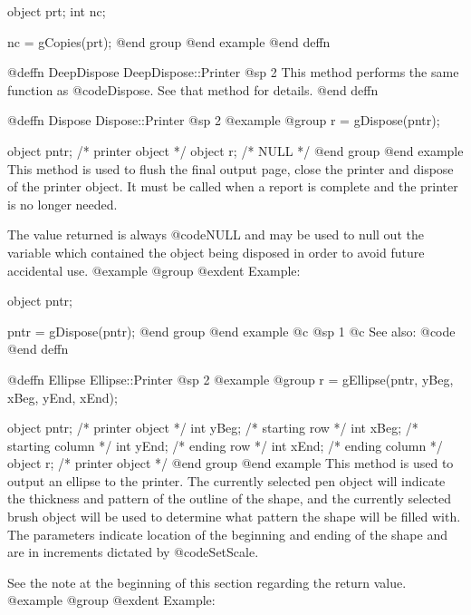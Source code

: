 object  prt;
int     nc;

nc = gCopies(prt);
@end group
@end example
@end deffn








@deffn {DeepDispose} DeepDispose::Printer
@sp 2
This method performs the same function as @code{Dispose}.  See that
method for details.
@end deffn





@deffn {Dispose} Dispose::Printer
@sp 2
@example
@group
r = gDispose(pntr); 

object  pntr;   /*  printer object  */
object  r;      /*  NULL            */
@end group
@end example
This method is used to flush the final output page, close the printer and
dispose of the printer object.  It must be called when a report is complete and the printer is no longer needed.

The value returned is always @code{NULL} and may be used to null out
the variable which contained the object being disposed in order to
avoid future accidental use.
@example
@group
@exdent Example:

object  pntr;

pntr = gDispose(pntr);
@end group
@end example
@c @sp 1
@c See also:  @code{}
@end deffn
















@deffn {Ellipse} Ellipse::Printer
@sp 2
@example
@group
r = gEllipse(pntr, yBeg, xBeg, yEnd, xEnd);

object  pntr;   /*  printer object   */
int     yBeg;   /*  starting row     */
int     xBeg;   /*  starting column  */
int     yEnd;   /*  ending row       */
int     xEnd;   /*  ending column    */
object  r;      /*  printer object   */
@end group
@end example
This method is used to output an ellipse to the printer.  The currently
selected pen object will indicate the thickness and pattern of the
outline of the shape, and the currently selected brush object will be
used to determine what pattern the shape will be filled with.  The
parameters indicate location of the beginning and ending of the shape
and are in increments dictated by @code{SetScale}.

See the note at the beginning of this section regarding the return value.
@example
@group
@exdent Example:

